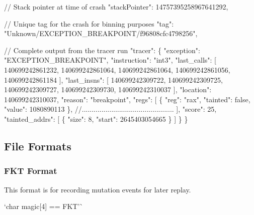 \begin{DoxyCode}
    \textcolor{comment}{// Stack pointer at time of crash}
    \textcolor{stringliteral}{"stackPointer"}: 14757395258967641292,

    \textcolor{comment}{// Unique tag for the crash for binning purposes}
    \textcolor{stringliteral}{"tag"}: \textcolor{stringliteral}{"Unknown/EXCEPTION\_BREAKPOINT/f96808cfc4798256"},

    \textcolor{comment}{// Complete output from the tracer run}
    \textcolor{stringliteral}{"tracer"}: \{
        \textcolor{stringliteral}{"exception"}: \textcolor{stringliteral}{"EXCEPTION\_BREAKPOINT"},
        \textcolor{stringliteral}{"instruction"}: \textcolor{stringliteral}{"int3"},
        \textcolor{stringliteral}{"last\_calls"}: [
            140699242861232,
            140699242861064,
            140699242861064,
            140699242861056,
            140699242861184
        ],
        \textcolor{stringliteral}{"last\_insns"}: [
            140699242309722,
            140699242309725,
            140699242309727,
            140699242309730,
            140699242310037
        ],
        \textcolor{stringliteral}{"location"}: 140699242310037,
        \textcolor{stringliteral}{"reason"}: \textcolor{stringliteral}{"breakpoint"},
        \textcolor{stringliteral}{"regs"}: [
            \{
                \textcolor{stringliteral}{"reg"}: \textcolor{stringliteral}{"rax"},
                \textcolor{stringliteral}{"tainted"}: \textcolor{keyword}{false},
                \textcolor{stringliteral}{"value"}: 1080890113
            \},
            \textcolor{comment}{//...............................................}
        ],
        \textcolor{stringliteral}{"score"}: 25,
        \textcolor{stringliteral}{"tainted\_addrs"}: [
            \{
                \textcolor{stringliteral}{"size"}: 8,
                \textcolor{stringliteral}{"start"}: 2645403054665
            \}
        ]
    \}
\}
\end{DoxyCode}


\subsection*{File Formats}

\subsubsection*{F\+KT Format}

This format is for recording mutation events for later replay.

`char magic\mbox{[}4\mbox{]} == \textquotesingle{}F\+KT'\`{}

